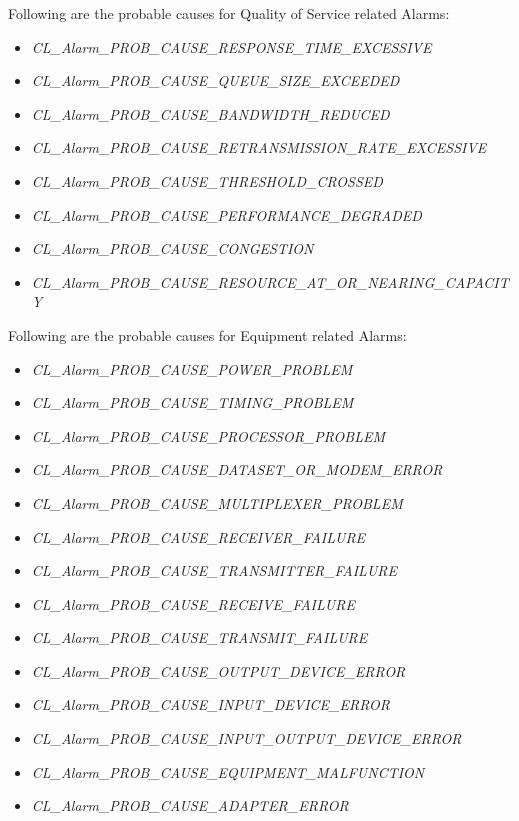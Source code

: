 \begin{flushleft}
\par
Following are the probable causes for Quality of Service related Alarms:
\begin{itemize}
\item \textit{CL\_\-Alarm\_\-PROB\_\-CAUSE\_\-RESPONSE\_\-TIME\_\-EXCESSIVE}
\item \textit{CL\_\-Alarm\_\-PROB\_\-CAUSE\_\-QUEUE\_\-SIZE\_\-EXCEEDED}
\item \textit{CL\_\-Alarm\_\-PROB\_\-CAUSE\_\-BANDWIDTH\_\-REDUCED}
\item \textit{CL\_\-Alarm\_\-PROB\_\-CAUSE\_\-RETRANSMISSION\_\-RATE\_\-EXCESSIVE}
\item \textit{CL\_\-Alarm\_\-PROB\_\-CAUSE\_\-THRESHOLD\_\-CROSSED}
\item \textit{CL\_\-Alarm\_\-PROB\_\-CAUSE\_\-PERFORMANCE\_\-DEGRADED}
\item \textit{CL\_\-Alarm\_\-PROB\_\-CAUSE\_\-CONGESTION}
\item \textit{CL\_\-Alarm\_\-PROB\_\-CAUSE\_\-RESOURCE\_\-AT\_\-OR\_\-NEARING\_\-CAPACITY}
\end{itemize}

\par
Following are the probable causes for Equipment related Alarms:
\begin{itemize}
\item \textit{CL\_\-Alarm\_\-PROB\_\-CAUSE\_\-POWER\_\-PROBLEM}
\item \textit{CL\_\-Alarm\_\-PROB\_\-CAUSE\_\-TIMING\_\-PROBLEM}
\item \textit{CL\_\-Alarm\_\-PROB\_\-CAUSE\_\-PROCESSOR\_\-PROBLEM}
\item \textit{CL\_\-Alarm\_\-PROB\_\-CAUSE\_\-DATASET\_\-OR\_\-MODEM\_\-ERROR}
\item \textit{CL\_\-Alarm\_\-PROB\_\-CAUSE\_\-MULTIPLEXER\_\-PROBLEM}
\item \textit{CL\_\-Alarm\_\-PROB\_\-CAUSE\_\-RECEIVER\_\-FAILURE}
\item \textit{CL\_\-Alarm\_\-PROB\_\-CAUSE\_\-TRANSMITTER\_\-FAILURE}
\item \textit{CL\_\-Alarm\_\-PROB\_\-CAUSE\_\-RECEIVE\_\-FAILURE}
\item \textit{CL\_\-Alarm\_\-PROB\_\-CAUSE\_\-TRANSMIT\_\-FAILURE}
\item \textit{CL\_\-Alarm\_\-PROB\_\-CAUSE\_\-OUTPUT\_\-DEVICE\_\-ERROR}
\item \textit{CL\_\-Alarm\_\-PROB\_\-CAUSE\_\-INPUT\_\-DEVICE\_\-ERROR}
\item \textit{CL\_\-Alarm\_\-PROB\_\-CAUSE\_\-INPUT\_\-OUTPUT\_\-DEVICE\_\-ERROR}
\item \textit{CL\_\-Alarm\_\-PROB\_\-CAUSE\_\-EQUIPMENT\_\-MALFUNCTION}
\item \textit{CL\_\-Alarm\_\-PROB\_\-CAUSE\_\-ADAPTER\_\-ERROR}
\end{itemize}


\end{flushleft}

